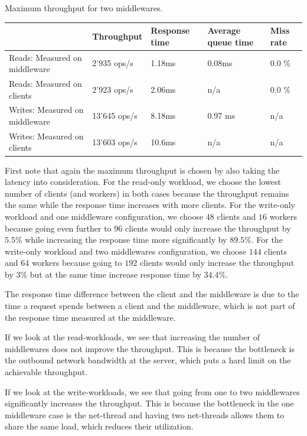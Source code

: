 \begin{center}
	{Maximum throughput for two middlewares.}
	\begin{tabular}{|p{5.7cm}|p{2.1cm}|p{1.9cm}|p{1.9cm}|p{1.9cm}|}
		\hline                                & Throughput & Response time & Average queue time & Miss rate \\ 
		\hline Reads: Measured on middleware  &   2'935 ops/s &  1.18ms     &    0.08ms      & 0.0 \%   \\ 
		\hline Reads: Measured on clients     &   2'923 ops/s  &  2.06ms       & n/a         &   0.0 \%  \\ 
		\hline Writes: Measured on middleware &   13'645 ops/s &  8.18ms      &      0.97 ms              & n/a       \\ 
		\hline Writes: Measured on clients    &   13'603 ops/s   &10.6ms        & n/a                   & n/a     \\ 
		\hline 
	\end{tabular}
\end{center}
First note that again the maximum throughput is chosen by also taking the latency into consideration.
For the read-only workload, we choose the lowest number of clients (and workers) in both cases because the throughput remains the same while the response time increases with more clients. For the write-only workload and one middleware configuration, we choose $48$ clients and $16$ workers because going even further to $96$ clients would only increase the throughput by $5.5\%$ while increasing the response time more significantly by $89.5\%$. For the write-only workload and two middlewares configuration, we choose $144$ clients and $64$ workers because going to $192$ clients would only increase the throughput by $3\%$ but at the same time increase response time by $34.4\%$.

The response time difference between the client and the middleware is due to the time a request spends between a client and the middleware, which is not part of the response time measured at the middleware. 

If we look at the read-workloads, we see that increasing the number of middlewares does not improve the throughput. This is because the bottleneck is the outbound network bandwidth at the server, which puts a hard limit on the achievable throughput. 

If we look at the write-workloads, we see that going from one to two middlewares significantly increases the throughput. This is because the bottleneck in the one middleware case is the net-thread and having two net-threads allows them to share the same load, which reduces their utilization. 




